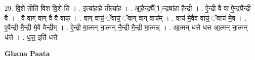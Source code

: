 \documentclass[17pt]{extarticle}
\begin{document}
29. वि॒शे तीति॑ विश वि॒शे ति॑ । . इत्या॑हा॒हे तीत्या॑ह । . आ॒है॒न्द्र्यै᳚(1॒)न्द्र्या॑हा है॒न्द्री । . ऐ॒न्द्री वै वा ऐ॒न्द्र्यै᳚न्द्री वै । . वै वाग् वाग् वै वै वाक् । . वाग् वाचं॒ ॅवाचं॒ ॅवाग् वाग् वाच᳚म् । . वाच॑ मे॒वैव वाचं॒ ॅवाच॑ मे॒व । . ए॒वैन्द्री मै॒न्द्री मे॒वै वैन्द्रीम् । . ऐ॒न्द्री मा॒त्मन् ना॒त्मन् नै॒न्द्री मै॒न्द्री मा॒त्मन्न् । . आ॒त्मन् ध॑त्ते धत्त आ॒त्मन् ना॒त्मन् ध॑त्ते । . ध॒त्त॒ इति॑ धत्ते । \newline

\textbf{Ghana Paata } \newline
\end{document}

